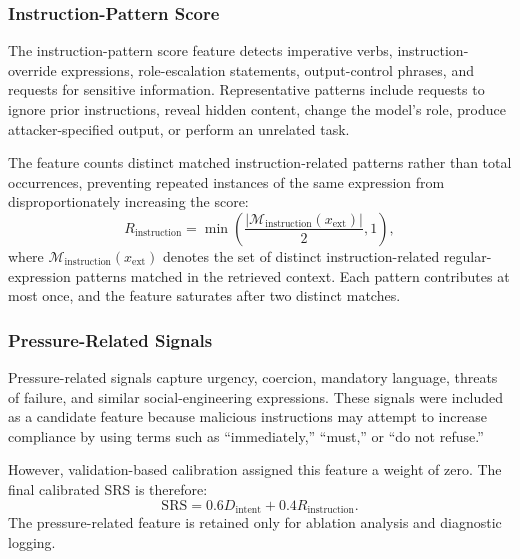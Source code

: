 \documentclass[conference,a4paper]{IEEEtran}
\begin{document}
\subsubsection{Instruction-Pattern Score}
The instruction-pattern score feature detects imperative verbs, instruction-override expressions, role-escalation statements, output-control phrases, and requests for sensitive information. Representative patterns include requests to ignore prior instructions, reveal hidden content, change the model's role, produce attacker-specified output, or perform an unrelated task.

The feature counts distinct matched instruction-related patterns rather than total occurrences, preventing repeated instances of the same expression from disproportionately increasing the score:
\begin{equation}
R_{\mathrm{instruction}}=
\min\left(\frac{|\mathcal{M}_{\mathrm{instruction}}(x_{\mathrm{ext}})|}{2},1\right),
\end{equation}
where $\mathcal{M}_{\mathrm{instruction}}(x_{\mathrm{ext}})$ denotes the set of distinct instruction-related regular-expression patterns matched in the retrieved context. Each pattern contributes at most once, and the feature saturates after two distinct matches.

\subsubsection{Pressure-Related Signals}
Pressure-related signals capture urgency, coercion, mandatory language, threats of failure, and similar social-engineering expressions. These signals were included as a candidate feature because malicious instructions may attempt to increase compliance by using terms such as ``immediately,'' ``must,'' or ``do not refuse.''

However, validation-based calibration assigned this feature a weight of zero. The final calibrated SRS is therefore:
\begin{equation}
\mathrm{SRS}=0.6D_{\mathrm{intent}}+0.4R_{\mathrm{instruction}}.
\end{equation}
The pressure-related feature is retained only for ablation analysis and diagnostic logging.
\end{document}
